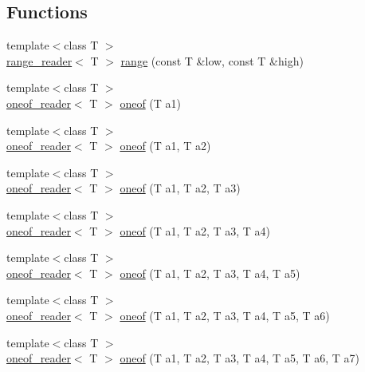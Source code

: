\subsection*{Functions}
\begin{DoxyCompactItemize}
\item 
{\footnotesize template$<$class T $>$ }\\\mbox{\hyperlink{structcmdline_1_1range__reader}{range\+\_\+reader}}$<$ T $>$ \mbox{\hyperlink{namespacecmdline_a254a4d230f6a0cd541273072ea2569c9}{range}} (const T \&low, const T \&high)
\item 
{\footnotesize template$<$class T $>$ }\\\mbox{\hyperlink{structcmdline_1_1oneof__reader}{oneof\+\_\+reader}}$<$ T $>$ \mbox{\hyperlink{namespacecmdline_aec34ff037ea9002323a2b656e1c49f93}{oneof}} (T a1)
\item 
{\footnotesize template$<$class T $>$ }\\\mbox{\hyperlink{structcmdline_1_1oneof__reader}{oneof\+\_\+reader}}$<$ T $>$ \mbox{\hyperlink{namespacecmdline_a197fdd07b0735c1c7382bfa4d3e1e884}{oneof}} (T a1, T a2)
\item 
{\footnotesize template$<$class T $>$ }\\\mbox{\hyperlink{structcmdline_1_1oneof__reader}{oneof\+\_\+reader}}$<$ T $>$ \mbox{\hyperlink{namespacecmdline_a5eb83c76445bb52917cd502939988f17}{oneof}} (T a1, T a2, T a3)
\item 
{\footnotesize template$<$class T $>$ }\\\mbox{\hyperlink{structcmdline_1_1oneof__reader}{oneof\+\_\+reader}}$<$ T $>$ \mbox{\hyperlink{namespacecmdline_ada9e08ffe87130e9e0bc97c8ae9e37ed}{oneof}} (T a1, T a2, T a3, T a4)
\item 
{\footnotesize template$<$class T $>$ }\\\mbox{\hyperlink{structcmdline_1_1oneof__reader}{oneof\+\_\+reader}}$<$ T $>$ \mbox{\hyperlink{namespacecmdline_ae68ed509566250984be762f4130b1598}{oneof}} (T a1, T a2, T a3, T a4, T a5)
\item 
{\footnotesize template$<$class T $>$ }\\\mbox{\hyperlink{structcmdline_1_1oneof__reader}{oneof\+\_\+reader}}$<$ T $>$ \mbox{\hyperlink{namespacecmdline_a15c6fb15804ac5f2680345f25752737a}{oneof}} (T a1, T a2, T a3, T a4, T a5, T a6)
\item 
{\footnotesize template$<$class T $>$ }\\\mbox{\hyperlink{structcmdline_1_1oneof__reader}{oneof\+\_\+reader}}$<$ T $>$ \mbox{\hyperlink{namespacecmdline_aab50ad7f54137d22779d9e857ccd5450}{oneof}} (T a1, T a2, T a3, T a4, T a5, T a6, T a7)

\end{DoxyCompactItemize}
